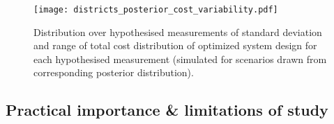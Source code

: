 \begin{figure}[t]
    \centering
    \texttt{[image: districts\_posterior\_cost\_variability.pdf]}
    \caption{Distribution over hypothesised measurements of standard deviation and range of total cost distribution of optimized system design for each hypothesised measurement (simulated for scenarios drawn from corresponding posterior distribution).}
    \label{fig:districts-posterior-variability}
\end{figure}


\subsection{Practical importance \& limitations of study} \label{sec:districts-practical-importance}




